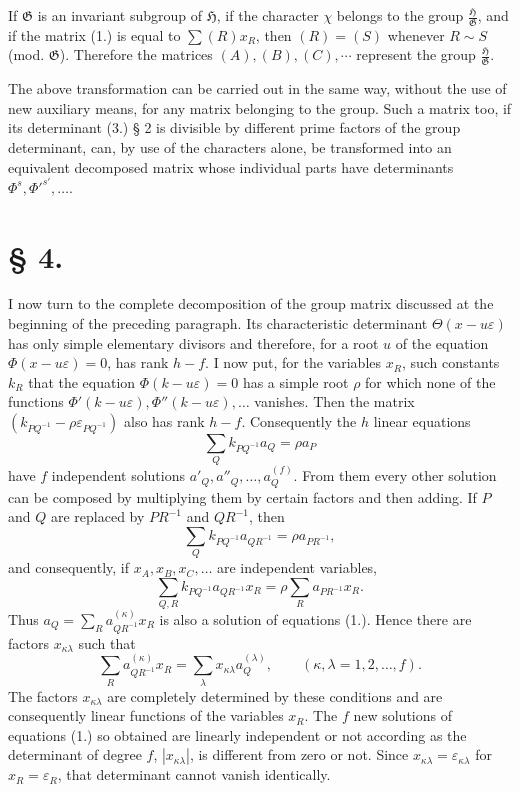 \documentclass[11pt]{article}
\newcommand{\Hgrp}{\mathfrak{H}}
\newcommand{\Ggrp}{\mathfrak{G}}
\newcommand{\eps}{\varepsilon}
\begin{document}
If $\Ggrp$ is an invariant subgroup of $\Hgrp$, if the character $\chi$ belongs to the group $\frac{\Hgrp}{\Ggrp}$, and if the matrix (1.) is equal to $\sum(R)x_R$, then $(R)=(S)$ whenever $R\sim S$ (mod. $\Ggrp$). Therefore the matrices $(A),(B),(C),\cdots$ represent the group $\frac{\Hgrp}{\Ggrp}$.

The above transformation can be carried out in the same way, without the use of new auxiliary means, for any matrix belonging to the group. Such a matrix too, if its determinant (3.) § 2 is divisible by different prime factors of the group determinant, can, by use of the characters alone, be transformed into an equivalent decomposed matrix whose individual parts have determinants $\Phi^s,{\Phi'}^{s'},\ldots$.

\section*{§ 4.}

I now turn to the complete decomposition of the group matrix discussed at the beginning of the preceding paragraph. Its characteristic determinant $\Theta(x-u\eps)$ has only simple elementary divisors and therefore, for a root $u$ of the equation $\Phi(x-u\eps)=0$, has rank $h-f$. I now put, for the variables $x_R$, such constants $k_R$ that the equation $\Phi(k-u\eps)=0$ has a simple root $\rho$ for which none of the functions $\Phi'(k-u\eps),\Phi''(k-u\eps),\ldots$ vanishes. Then the matrix $(k_{PQ^{-1}}-\rho\eps_{PQ^{-1}})$ also has rank $h-f$. Consequently the $h$ linear equations
\begin{equation}\tag{1.}
\sum_Q k_{PQ^{-1}}a_Q=\rho a_P
\end{equation}
have $f$ independent solutions $a'_Q,a''_Q,\ldots,a^{(f)}_Q$. From them every other solution can be composed by multiplying them by certain factors and then adding. If $P$ and $Q$ are replaced by $PR^{-1}$ and $QR^{-1}$, then
\[
\sum_Q k_{PQ^{-1}}a_{QR^{-1}}=\rho a_{PR^{-1}},
\]
and consequently, if $x_A,x_B,x_C,\ldots$ are independent variables,
\[
\sum_{Q,R} k_{PQ^{-1}}a_{QR^{-1}}x_R=\rho\sum_R a_{PR^{-1}}x_R.
\]
Thus $a_Q=\sum_R a^{(\kappa)}_{QR^{-1}}x_R$ is also a solution of equations (1.). Hence there are factors $x_{\kappa\lambda}$ such that
\begin{equation}\tag{2.}
\sum_R a^{(\kappa)}_{QR^{-1}}x_R=\sum_\lambda x_{\kappa\lambda}a^{(\lambda)}_Q,\qquad(\kappa,\lambda=1,2,\ldots,f).
\end{equation}
The factors $x_{\kappa\lambda}$ are completely determined by these conditions and are consequently linear functions of the variables $x_R$. The $f$ new solutions of equations (1.) so obtained are linearly independent or not according as the determinant of degree $f$, $|x_{\kappa\lambda}|$, is different from zero or not. Since $x_{\kappa\lambda}=\eps_{\kappa\lambda}$ for $x_R=\eps_R$, that determinant cannot vanish identically.
\end{document}
